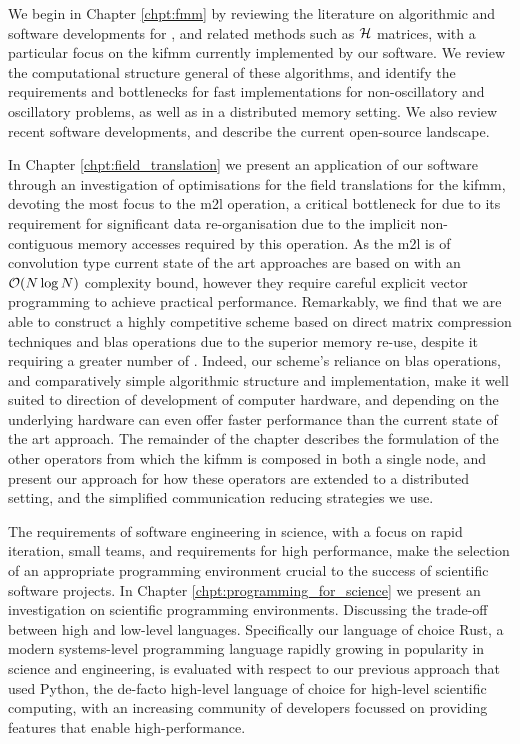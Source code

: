 We begin in Chapter \ref{chpt:fmm} by reviewing the literature on algorithmic and software developments for , and related methods such as $\mathcal{H}$ matrices, with a particular focus on the \acrshort{kifmm} currently implemented by our software. We review the computational structure general of these algorithms, and identify the requirements and bottlenecks for fast implementations for non-oscillatory and oscillatory problems, as well as in a distributed memory setting. We also review recent software developments, and describe the current open-source landscape.

In Chapter \ref{chpt:field_translation} we present an application of our software through an investigation of optimisations for the field translations for the \acrshort{kifmm}, devoting the most focus to the \acrfull{m2l} operation, a critical bottleneck for  due to its requirement for significant data re-organisation due to the implicit non-contiguous memory accesses required by this operation. As the \acrshort{m2l} is of convolution type current state of the art approaches are based on  with an $\mathcal{O}(N \log{N})$ complexity bound, however they require careful explicit vector programming to achieve practical performance. Remarkably, we find that we are able to construct a highly competitive scheme based on direct matrix compression techniques and \acrfull{blas} operations due to the superior memory re-use, despite it requiring a greater number of . Indeed, our scheme's reliance on \acrshort{blas} operations, and comparatively simple algorithmic structure and implementation, make it well suited to direction of development of computer hardware, and depending on the underlying hardware can even offer faster performance than the current state of the art approach. The remainder of the chapter describes the formulation of the other operators from which the \acrshort{kifmm} is composed in both a single node, and present our approach for how these operators are extended to a distributed setting, and the simplified communication reducing strategies we use.

The requirements of software engineering in science, with a focus on rapid iteration, small teams, and requirements for high performance, make the selection of an appropriate programming environment crucial to the success of scientific software projects. In Chapter \ref{chpt:programming_for_science} we present an investigation on scientific programming environments. Discussing the trade-off between high and low-level languages. Specifically our language of choice Rust, a modern systems-level programming language rapidly growing in popularity in science and engineering, is evaluated with respect to our previous approach that used Python, the de-facto high-level language of choice for high-level scientific computing, with an increasing community of developers focussed on providing features that enable high-performance.

